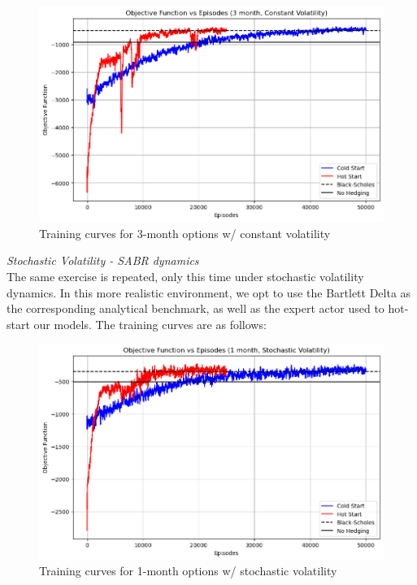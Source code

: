 \documentclass{article}
\begin{document}
\begin{figure}[H]
    \centering
    \includegraphics[width=.9\linewidth]{figures/3m_const.png}
    \caption{Training curves for 3-month options w/ constant volatility}
    \label{fig:3m_const}
\end{figure}
\textit{Stochastic Volatility - SABR dynamics}\\
The same exercise is repeated, only this time under stochastic volatility dynamics. In this more realistic environment, we opt to use the Bartlett Delta as the corresponding analytical benchmark, as well as the expert actor used to hot-start our models. The training curves are as follows:\\
\begin{figure}[h!]
    \centering
    \includegraphics[width=.9\linewidth]{figures/1m_stoch.png}
    \caption{Training curves for 1-month options w/ stochastic volatility}
    \label{fig:1m_stoch}
\end{figure}\\
\end{document}
